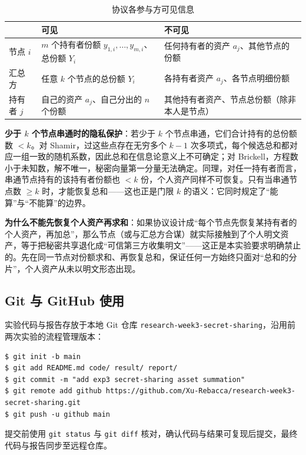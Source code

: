 \documentclass{SYSUReport}
\begin{document}
\begin{table}[htbp]
\centering
\caption{协议各参与方可见信息}
\label{tab:privacy}
\begin{tabular}{p{3.2cm}p{6.2cm}p{6.2cm}}
\toprule
 & \textbf{可见} & \textbf{不可见} \\
\midrule
节点 $i$ & $m$ 个持有者份额 $y_{1,i}, \ldots, y_{m,i}$、总份额 $Y_i$ & 任何持有者的资产 $a_j$、其他节点的份额 \\
汇总方 & 任意 $k$ 个节点的总份额 $Y_i$ & 各持有者资产 $a_j$、各节点明细份额 \\
持有者 $j$ & 自己的资产 $a_j$、自己分出的 $n$ 个份额 & 其他持有者资产、节点总份额（除非本人是节点）\\
\bottomrule
\end{tabular}
\end{table}

\textbf{少于 $k$ 个节点串通时的隐私保护}：若少于 $k$ 个节点串通，它们合计持有的总份额数 $< k$。对 Shamir，过这些点存在无穷多个 $k-1$ 次多项式，每个候选总和都对应一组一致的随机系数，因此总和在信息论意义上不可确定；对 Brickell，方程数小于未知数，解不唯一，秘密向量第一分量无法确定。同理，对任一持有者而言，串通节点持有的该持有者份额也 $< k$ 份，个人资产同样不可恢复。只有当串通节点数 $\ge k$ 时，才能恢复总和——这也正是门限 $k$ 的语义：它同时规定了“能算”与“不能算”的边界。

\textbf{为什么不能先恢复个人资产再求和}：如果协议设计成“每个节点先恢复某持有者的个人资产，再加总”，那么节点（或与汇总方合谋）就实际接触到了个人明文资产，等于把秘密共享退化成“可信第三方收集明文”——这正是本实验要求明确禁止的。先在同一节点对份额求和、再恢复总和，保证任何一方始终只面对“总和的分片”，个人资产从未以明文形态出现。

\subsection{Git 与 GitHub 使用}

实验代码与报告存放于本地 Git 仓库 \texttt{research-week3-secret-sharing}，沿用前两次实验的流程管理版本：

\begin{lstlisting}[caption={Git 版本管理流程}]
$ git init -b main
$ git add README.md code/ result/ report/
$ git commit -m "add exp3 secret-sharing asset summation"
$ git remote add github https://github.com/Xu-Rebacca/research-week3-secret-sharing.git
$ git push -u github main
\end{lstlisting}

提交前使用 \texttt{git status} 与 \texttt{git diff} 核对，确认代码与结果可复现后提交，最终代码与报告同步至远程仓库。
\end{document}
